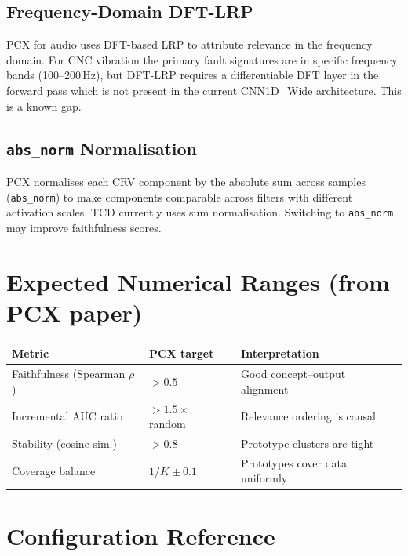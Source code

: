 \documentclass[11pt,a4paper]{article}
\begin{document}
\subsection{Frequency-Domain DFT-LRP}
PCX for audio uses DFT-based LRP to attribute relevance in the frequency
domain.  For CNC vibration the primary fault signatures are in specific
frequency bands (100--200\,Hz), but DFT-LRP requires a differentiable DFT
layer in the forward pass which is not present in the current CNN1D\_Wide
architecture.  This is a known gap.

\subsection{\texttt{abs\_norm} Normalisation}
PCX normalises each CRV component by the absolute sum across samples
(\texttt{abs\_norm}) to make components comparable across filters with
different activation scales.  TCD currently uses sum normalisation.  Switching
to \texttt{abs\_norm} may improve faithfulness scores.

\section{Expected Numerical Ranges (from PCX paper)}

\begin{center}
\begin{tabular}{lll}
\toprule
\textbf{Metric} & \textbf{PCX target} & \textbf{Interpretation} \\
\midrule
Faithfulness (Spearman $\rho$) & $> 0.5$ & Good concept--output alignment \\
Incremental AUC ratio & $> 1.5\times$ random & Relevance ordering is causal \\
Stability (cosine sim.) & $> 0.8$ & Prototype clusters are tight \\
Coverage balance & $1/K \pm 0.1$ & Prototypes cover data uniformly \\
\bottomrule
\end{tabular}
\end{center}

\section{Configuration Reference}
\end{document}
